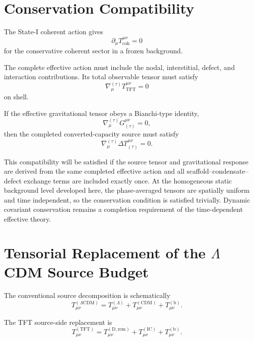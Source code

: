 \section{Conservation Compatibility}

The State-I coherent action gives
\begin{equation}
    \partial_\mu T_{\mathrm{coh}}^{\mu\nu}=0
\end{equation}
for the conservative coherent sector in a frozen background.

The complete effective action must include the nodal, interstitial, defect, and interaction contributions. Its total observable tensor must satisfy
\begin{equation}
    \nabla_\mu^{(\tau)} T_{\mathrm{TFT}}^{\mu\nu} = 0
\end{equation}
on shell.

If the effective gravitational tensor obeys a Bianchi-type identity,
\begin{equation}
    \nabla_\mu^{(\tau)} G_{(\tau)}^{\mu\nu} = 0,
\end{equation}
then the completed converted-capacity source must satisfy
\begin{equation}
    \nabla_\mu^{(\tau)} \Delta T_{(\tau)}^{\mu\nu} = 0.
\end{equation}

This compatibility will be satisfied if the source tensor and gravitational response are derived from the same completed effective action and all scaffold--condensate--defect exchange terms are included exactly once. At the homogeneous static background level developed here, the phase-averaged tensors are spatially uniform and time independent, so the conservation condition is satisfied trivially. Dynamic covariant conservation remains a completion requirement of the time-dependent effective theory.

\section{Tensorial Replacement of the \texorpdfstring{$\Lambda$CDM}{LambdaCDM} Source Budget}

The conventional source decomposition is schematically
\begin{equation}
    T_{\mu\nu}^{(\Lambda\mathrm{CDM})} = T_{\mu\nu}^{(\Lambda)} + T_{\mu\nu}^{(\mathrm{CDM})} + T_{\mu\nu}^{(\mathrm{b})}.
\end{equation}

The TFT source-side replacement is
\begin{equation}
    T_{\mu\nu}^{(\mathrm{TFT})} = T_{\mu\nu}^{(\mathrm{D},\mathrm{rem})} + T_{\mu\nu}^{(\mathrm{IC})} + T_{\mu\nu}^{(\mathrm{b})}.
\end{equation}

